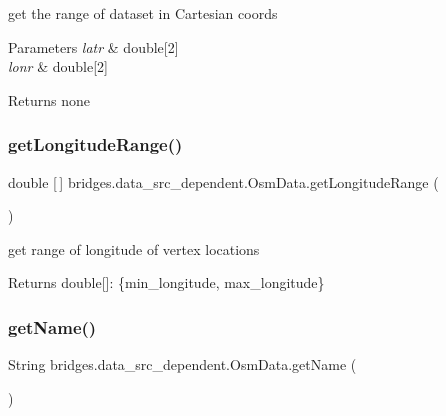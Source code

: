 get the range of dataset in Cartesian coords


\begin{DoxyParams}{Parameters}
{\em latr} & double\mbox{[}2\mbox{]} \\
\hline
{\em lonr} & double\mbox{[}2\mbox{]} \\
\hline
\end{DoxyParams}
\begin{DoxyReturn}{Returns}
none 
\end{DoxyReturn}
\mbox{\label{classbridges_1_1data__src__dependent_1_1_osm_data_a4a30fc62901cd0cea50d2e4a266c6c05}} 
\subsubsection{\texorpdfstring{getLongitudeRange()}{getLongitudeRange()}}
{\footnotesize\ttfamily double \mbox{[}$\,$\mbox{]} bridges.\+data\+\_\+src\+\_\+dependent.\+Osm\+Data.\+get\+Longitude\+Range (\begin{DoxyParamCaption}{ }\end{DoxyParamCaption})}

get range of longitude of vertex locations \begin{DoxyReturn}{Returns}
double\mbox{[}\mbox{]}\+: \{min\+\_\+longitude, max\+\_\+longitude\} 
\end{DoxyReturn}
\mbox{\label{classbridges_1_1data__src__dependent_1_1_osm_data_ab239e638adb7cd65a3fc7e735f6d1e61}} 
\subsubsection{\texorpdfstring{getName()}{getName()}}
{\footnotesize\ttfamily String bridges.\+data\+\_\+src\+\_\+dependent.\+Osm\+Data.\+get\+Name (\begin{DoxyParamCaption}{ }\end{DoxyParamCaption})}

